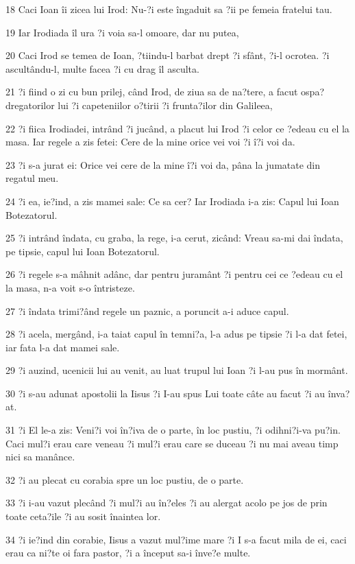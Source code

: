 \par 18 Caci Ioan îi zicea lui Irod: Nu-?i este îngaduit sa ?ii pe femeia fratelui tau.
\par 19 Iar Irodiada îl ura ?i voia sa-l omoare, dar nu putea,
\par 20 Caci Irod se temea de Ioan, ?tiindu-l barbat drept ?i sfânt, ?i-l ocrotea. ?i ascultându-l, multe facea ?i cu drag îl asculta.
\par 21 ?i fiind o zi cu bun prilej, când Irod, de ziua sa de na?tere, a facut ospa? dregatorilor lui ?i capeteniilor o?tirii ?i frunta?ilor din Galileea,
\par 22 ?i fiica Irodiadei, intrând ?i jucând, a placut lui Irod ?i celor ce ?edeau cu el la masa. Iar regele a zis fetei: Cere de la mine orice vei voi ?i î?i voi da.
\par 23 ?i s-a jurat ei: Orice vei cere de la mine î?i voi da, pâna la jumatate din regatul meu.
\par 24 ?i ea, ie?ind, a zis mamei sale: Ce sa cer? Iar Irodiada i-a zis: Capul lui Ioan Botezatorul.
\par 25 ?i intrând îndata, cu graba, la rege, i-a cerut, zicând: Vreau sa-mi dai îndata, pe tipsie, capul lui Ioan Botezatorul.
\par 26 ?i regele s-a mâhnit adânc, dar pentru juramânt ?i pentru cei ce ?edeau cu el la masa, n-a voit s-o întristeze.
\par 27 ?i îndata trimi?ând regele un paznic, a poruncit a-i aduce capul.
\par 28 ?i acela, mergând, i-a taiat capul în temni?a, l-a adus pe tipsie ?i l-a dat fetei, iar fata l-a dat mamei sale.
\par 29 ?i auzind, ucenicii lui au venit, au luat trupul lui Ioan ?i l-au pus în mormânt.
\par 30 ?i s-au adunat apostolii la Iisus ?i I-au spus Lui toate câte au facut ?i au înva?at.
\par 31 ?i El le-a zis: Veni?i voi în?iva de o parte, în loc pustiu, ?i odihni?i-va pu?in. Caci mul?i erau care veneau ?i mul?i erau care se duceau ?i nu mai aveau timp nici sa manânce.
\par 32 ?i au plecat cu corabia spre un loc pustiu, de o parte.
\par 33 ?i i-au vazut plecând ?i mul?i au în?eles ?i au alergat acolo pe jos de prin toate ceta?ile ?i au sosit înaintea lor.
\par 34 ?i ie?ind din corabie, Iisus a vazut mul?ime mare ?i I s-a facut mila de ei, caci erau ca ni?te oi fara pastor, ?i a început sa-i înve?e multe.
